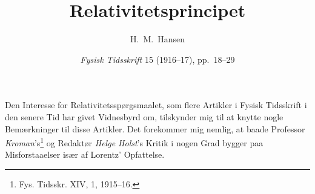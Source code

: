 \documentclass[12pt,a4paper]{article}
\title{\textbf{\guillemotright Relativitetsprincipet\guillemotleft}}
\author{H.\ M.\ Hansen}
\date{\textit{Fysisk Tidsskrift} 15 (1916--17), pp.~18--29}
\newif\ifembargo
\newcommand{\opage}[1]{\marginnote{\footnotesize\textit{[#1]}}}
\begin{document}
\maketitle
\ifembargo
\begin{center}\fbox{\parbox{0.86\textwidth}{\small\centering
\textbf{READING COPY --- NOT FOR CIRCULATION.}\\[2pt]
In copyright in Denmark until 31 December 2026 (H.\,M.\ Hansen died
13 June 1956; the term is life\,+\,70). Public domain from 1 January 2027.
Made for private study; please do not post or forward.}}\end{center}
\bigskip
\fi

\opage{18} %
%
\setcounter{footnote}{0}%
Den Interesse for Relativitetsspørgsmaalet, som flere Artikler i
Fysisk Tidsskrift i den senere Tid har givet Vidnesbyrd om, tilskynder
mig til at knytte nogle Bemærkninger til disse Artikler. Det forekommer
mig nemlig, at baade Professor \emph{Kroman}'s\footnote{Fys. Tidsskr.
XIV, 1, 1915--16.} og Redaktør \emph{Helge Holst}'s Kritik i nogen Grad
bygger paa Misforstaaelser især af Lorentz' Opfattelse.
\end{document}
